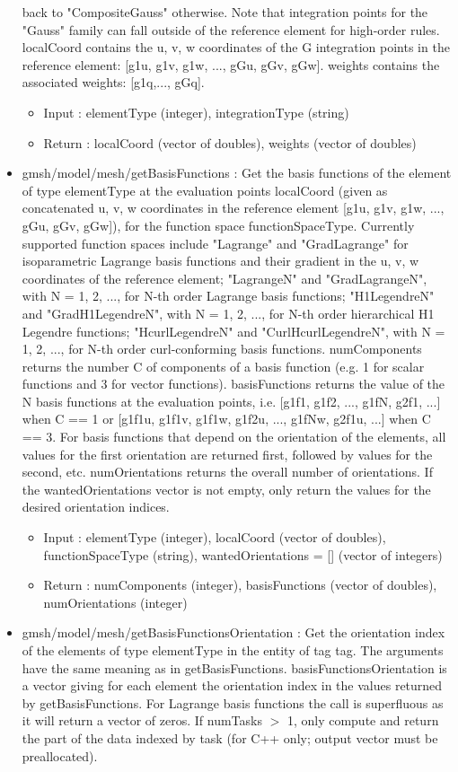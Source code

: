 \documentclass[dvipdfmx, 9pt, a4paper]{article}
\numberwithin{equation}{section}
\begin{document}
\begin{itemize}
back to "CompositeGauss" otherwise. Note that integration points for the "Gauss" family can fall outside of the reference element for high-order rules. localCoord contains the u, v, w coordinates of the G integration points in the reference element: [g1u, g1v, g1w, ..., gGu, gGv, gGw]. weights contains the associated weights: [g1q,..., gGq].
\begin{itemize}
\item Input : elementType (integer), integrationType (string)
\item Return : localCoord (vector of doubles), weights (vector of doubles)
\end{itemize}
\item gmsh/model/mesh/getBasisFunctions : Get the basis functions of the element of type elementType at the evaluation points localCoord (given as concatenated u, v, w coordinates in the reference element [g1u, g1v, g1w, ..., gGu, gGv, gGw]), for the function space functionSpaceType. Currently supported function spaces include "Lagrange" and "GradLagrange" for isoparametric Lagrange basis functions and their gradient in the u, v, w coordinates of the reference element; "LagrangeN" and "GradLagrangeN", with N = 1, 2, ...,
for N-th order Lagrange basis functions; "H1LegendreN" and "GradH1LegendreN", with N = 1, 2, ..., for N-th order hierarchical H1 Legendre functions; "HcurlLegendreN" and "CurlHcurlLegendreN", with N = 1, 2, ..., for N-th order curl-conforming basis functions. numComponents returns the number C of components of a basis function (e.g. 1 for scalar functions and 3 for vector functions). basisFunctions returns the value of the N basis functions at the evaluation points, i.e. [g1f1, g1f2, ..., g1fN, g2f1, ...] when C == 1 or [g1f1u, g1f1v, g1f1w, g1f2u, ..., g1fNw, g2f1u, ...] when C == 3. For basis functions that depend on the orientation of the elements, all values for the first orientation are returned first, followed by values for the second, etc. numOrientations returns the overall number of orientations. If
the wantedOrientations vector is not empty, only return the values for the desired orientation indices.
\begin{itemize}
\item Input : elementType (integer), localCoord (vector of doubles), functionSpaceType (string), wantedOrientations = [] (vector of integers)
\item Return : numComponents (integer), basisFunctions (vector of doubles), numOrientations (integer)
\end{itemize}
\item gmsh/model/mesh/getBasisFunctionsOrientation : Get the orientation index of the elements of type elementType in the entity of tag tag. The arguments have the same meaning as in getBasisFunctions. basisFunctionsOrientation is a vector giving for each element the orientation index in the values returned by getBasisFunctions. For Lagrange basis functions the call is superfluous as it will return a vector of zeros. If numTasks $>$ 1, only compute and return the part of the data indexed by task (for C++ only; output vector must be preallocated).

\end{itemize}
\end{document}
